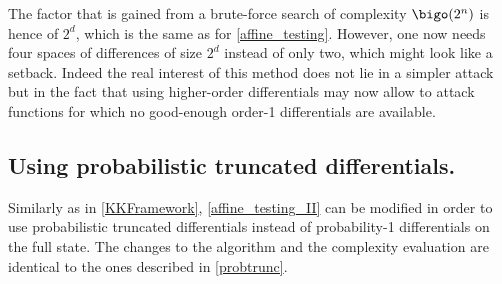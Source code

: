       The factor that is gained from a brute-force search of complexity $\bigo(2^n)$ is hence of
      $2^d$, which is the same as for \autoref{affine_testing}. However, one now needs
      four spaces of differences of size $2^d$ instead of only two,
      which might look like a setback. Indeed the real
      interest of this method does not lie in a simpler attack but in the fact that
      using higher-order differentials may now allow to attack functions for which no
      good-enough order-1 differentials are available.


    \subsection{Using probabilistic truncated differentials.}
    Similarly as in  \autoref{KKFramework}, \autoref{affine_testing_II} can be modified in order
    to use probabilistic truncated differentials instead of probability-1 differentials
    on the full state. The changes to the algorithm and the complexity evaluation are
    identical to the ones described in \autoref{probtrunc}.
